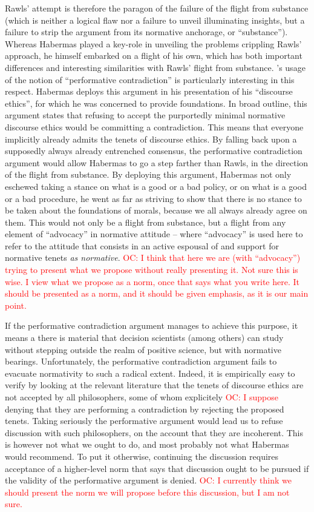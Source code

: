 \documentclass[preprint, french, english, 11pt, authoryear]{elsarticle}%
\newcommand{\commentOC}[1]{\textcolor{red}{OC: #1}}
\begin{document}
Rawls' attempt is therefore the paragon of the failure of the flight from substance (which is neither a logical flaw nor a failure to unveil illuminating insights, but a failure to strip the argument from its normative anchorage, or ``substance''). Whereas Habermas played a key-role in unveiling the problems crippling Rawls' approach, he himself embarked on a flight of his own, which has both important differences and interesting similarities with Rawls' flight from substance. \cite{habermas_moralbewustsein_1983}'s usage of the notion of ``performative contradiction'' is particularly interesting in this respect. Habermas deploys this argument in his presentation of his ``discourse ethics'', for which he was concerned to provide foundations. In broad outline, this argument states that refusing to accept the purportedly minimal normative discourse ethics would be committing a contradiction. This means that everyone implicitly already admits the tenets of discourse ethics. By falling back upon a supposedly always already entrenched consensus, the performative contradiction argument would allow Habermas to go a step farther than Rawls, in the direction of the flight from substance. By deploying this argument, Habermas not only eschewed taking a stance on what is a good or a bad policy, or on what is a good or a bad procedure, he went as far as striving to show that there is no stance to be taken about the foundations of morals, because we all always already agree on them. This would not only be a flight from substance, but a flight from any element of ``advocacy'' in normative attitude -- where ``advocacy'' is used here to refer to the attitude that consists in an active espousal of and support for normative tenets \emph{as normative}. 
\commentOC{I think that here we are (with “advocacy”) trying to present what we propose without really presenting it. Not sure this is wise. I view what we propose as a norm, once that says what you write here. It should be presented as a norm, and it should be given emphasis, as it is our main point.}

If the performative contradiction argument manages to achieve this purpose, it means a there is material that decision scientists (among others) can study without stepping outside the realm of positive science, but with normative bearings. Unfortunately, the performative contradiction argument fails to evacuate normativity to such a radical extent. Indeed, it is empirically easy to verify by looking at the relevant literature that the tenets of discourse ethics are not accepted by all philosophers, some of whom explicitely \commentOC{I suppose} denying that they are performing a contradiction by rejecting the proposed tenets. Taking seriously the performative argument would lead us to refuse discussion with such philosophers, on the account that they are incoherent. This is however not what we ought to do, and most probably not what Habermas would recommend. To put it otherwise, continuing the discussion requires acceptance of a higher-level norm that says that discussion ought to be pursued if the validity of the performative argument is denied.
\commentOC{I currently think we should present the norm we will propose before this discussion, but I am not sure.}
\end{document}
